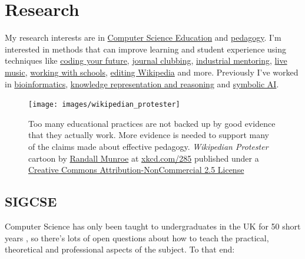 \documentclass[
  12pt,
]{book}
\begin{document}
\hypertarget{research}{%
\chapter{Research}\label{research}}

My research interests are in \href{https://en.wikipedia.org/wiki/Computer_science_education}{Computer Science Education} and \href{https://en.wikipedia.org/wiki/Pedagogy}{pedagogy}. \citep{CERhandbook, JohnBiggs2011, Fry2014} I'm interested in methods that can improve learning and student experience using techniques like \href{https://www.cdyf.me}{coding your future}, \href{https://sigcse.cs.manchester.ac.uk/}{journal clubbing}, \href{https://www.cs.manchester.ac.uk/connect/business-engagement/industrial-mentoring/}{industrial mentoring}, \protect\hyperlink{tuningcomplete}{live music}, \href{https://personalpages.manchester.ac.uk/staff/duncan.hull/coding-their-future.html}{working with schools}, \protect\hyperlink{wikipedia}{editing Wikipedia} and more. Previously I've worked in \href{https://en.wikipedia.org/wiki/Bioinformatics}{bioinformatics}, \href{https://en.wikipedia.org/wiki/Knowledge_representation_and_reasoning}{knowledge representation and reasoning} and \href{https://en.wikipedia.org/wiki/Symbolic_artificial_intelligence}{symbolic AI}.

\begin{figure}

{\centering \texttt{[image: images/wikipedian\_protester]} 

}

\caption{Too many educational practices are not backed up by good evidence that they actually work. More evidence is needed to support many of the claims made about effective pedagogy. \emph{Wikipedian Protester} cartoon by \href{https://en.wikipedia.org/wiki/Randall_Munroe}{Randall Munroe} at \href{https://xkcd.com/285/}{xkcd.com/285} published under a \href{https://creativecommons.org/licenses/by-nc/2.5/}{Creative Commons Attribution-NonCommercial 2.5 License}}\label{fig:unnamed-chunk-5}
\end{figure}



\hypertarget{sigcse}{%
\section{SIGCSE}\label{sigcse}}

Computer Science has only been taught to undergraduates in the UK for 50 short years \citep{babygrowsup, sigcse50}, so there's lots of open questions about how to teach the practical, theoretical and professional aspects of the subject. To that end:
\end{document}
